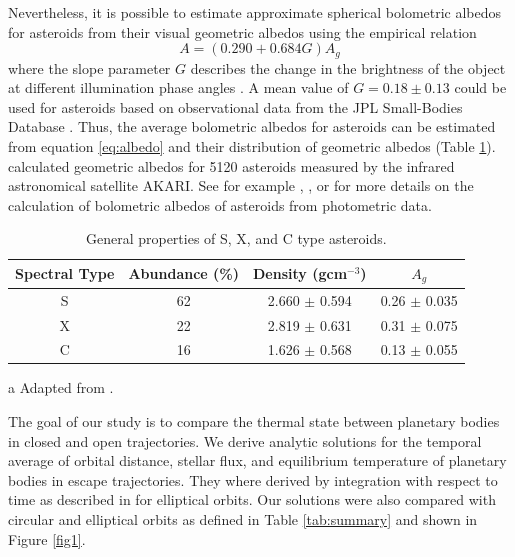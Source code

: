 \documentclass[a4paper,fleqn,usenatbib]{mnras}
\begin{document}
Nevertheless, it is possible to estimate approximate spherical bolometric albedos for asteroids from their visual geometric albedos using the empirical relation
\begin{equation} \label{eq:albedo}
A=(0.290+0.684G)A_g
\end{equation}
where the slope parameter $G$ describes the change in the brightness of the object at different illumination phase angles \citep{2008Icar..195..674S}. A mean value of $G = 0.18 \pm 0.13$ could be used for asteroids based on observational data from the JPL Small-Bodies Database \citep{2013PhDT.......424C}. Thus, the average bolometric albedos for asteroids can be estimated from equation \ref{eq:albedo} and their distribution of geometric albedos (Table \ref{tab:asteroids}). \citet{2013ApJ...762...56U} calculated geometric albedos for 5120 asteroids measured by the infrared astronomical satellite AKARI. See for example \citet{1989aste.conf..524B}, \citet{2011LPI....42.1028S}, \citet{2013Icar..226.1252L} or \citet{2015aste.book..107D} for more details on the calculation of bolometric albedos of asteroids from photometric data.  

\begin{table}
\begin{threeparttable}
\centering
\caption{General properties of S, X, and C type asteroids.}
\begin{tabular}{ c c c c }
 \hline
 \hline
Spectral Type & Abundance (\%) & Density (gcm$^{-3}$) & $A_g$ \\
\hline
	S & 62 & 2.660 $\pm$ 0.594 & 0.26 $\pm$ 0.035 \\
	X & 22 & 2.819 $\pm$ 0.631 & 0.31 $\pm$ 0.075 \\
	C & 16 & 1.626 $\pm$ 0.568 & 0.13 $\pm$ 0.055 \\
 \hline
 \hline
\end{tabular}
\label{tab:asteroids}
	\begin{tablenotes}
	\small
\item[a]{Adapted from \citet{2013PhDT.......424C}.}
	\end{tablenotes}
\end{threeparttable}
\end{table}

The goal of our study is to compare the thermal state between planetary bodies in closed and open trajectories. We derive analytic solutions for the temporal average of orbital distance, stellar flux, and equilibrium temperature of planetary bodies in escape trajectories. They where derived by integration with respect to time as described in \citet{2017ApJ...837L...1M} for elliptical orbits. Our solutions were also compared with circular and elliptical orbits as defined in Table \ref{tab:summary} and shown in Figure \ref{fig1}. 
\end{document}
